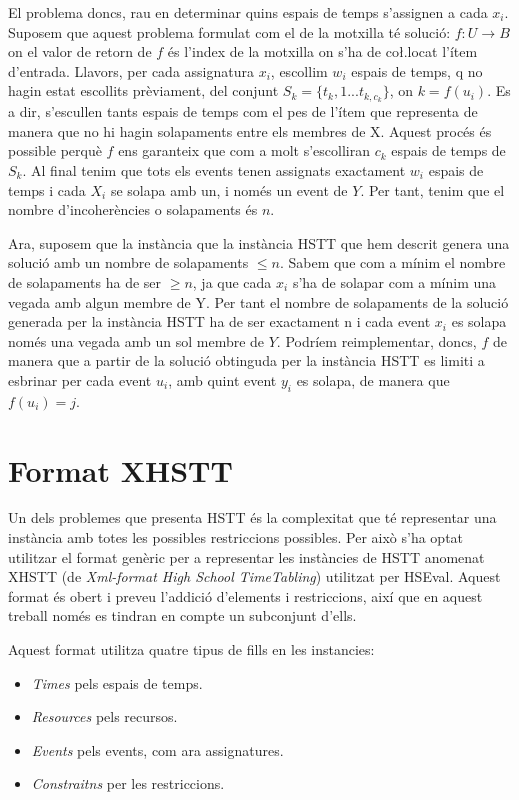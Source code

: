 \documentclass[11pt,a4paper,twoside]{report}
\begin{document}
    El problema doncs, rau en determinar quins espais de temps s'assignen a cada $x_i$. 
    Suposem que aquest problema formulat com el de la motxilla té solució: $f: U \rightarrow B$ on el valor de retorn de $f$ és l'index de la motxilla on s'ha de co\l.locat l'ítem d'entrada. 
    Llavors, per cada assignatura $x_i$, escollim $w_i$ espais de temps, q no hagin estat escollits prèviament, del conjunt $S_k = \{t_k,1 ... t_{k, c_k}\}$, on $k = f(u_i)$. 
    Es a dir, s'escullen tants espais de temps com el pes de l'ítem que representa de manera que no hi hagin solapaments entre els membres de X. Aquest procés és possible perquè $f$ ens garanteix que com a molt s'escolliran $c_k$ espais de temps de $S_k$. 
    Al final tenim que tots els events tenen assignats exactament $w_i$ espais de temps i cada $X_i$ se solapa amb un, i només un event de $Y$. Per tant, tenim que el nombre d'incoherències o solapaments és $n$.
    
    Ara, suposem que la instància que la instància HSTT que hem descrit genera una solució amb un nombre de solapaments $\leq n$. Sabem que com a mínim el nombre de solapaments ha de ser $\geq n$, ja que cada $x_i$ 
    s'ha de solapar com a mínim una vegada amb algun membre de Y. Per tant el nombre de solapaments de la solució generada per la instància HSTT ha de ser exactament n i cada event $x_i$ es solapa només una vegada amb un sol membre de $Y$.
    Podríem reimplementar, doncs, $f$ de manera que a partir de la solució obtinguda per la instància HSTT es limiti a esbrinar per cada event $u_i$, amb quint event $y_i$ es solapa, de manera que $f(u_i) =j$.

  \section{Format XHSTT}
  Un dels problemes que presenta HSTT és la complexitat que té representar una instància amb totes les possibles restriccions possibles. Per això s'ha optat utilitzar el format genèric per a representar les instàncies de HSTT anomenat XHSTT (de \textit{Xml-format High School TimeTabling}) utilitzat per HSEval\cite{xhstt}.
  Aquest format és obert i preveu l'addició d'elements i restriccions, així que en aquest treball només es tindran en compte un subconjunt d'ells.
  
  Aquest format utilitza quatre tipus de fills en les instancies:
  \begin{itemize}
    \item \textit{Times} pels espais de temps.
    \item \textit{Resources} pels recursos.
    \item \textit{Events} pels events, com ara assignatures.
    \item \textit{Constraitns} per les restriccions.
  \end{itemize}
\end{document}
